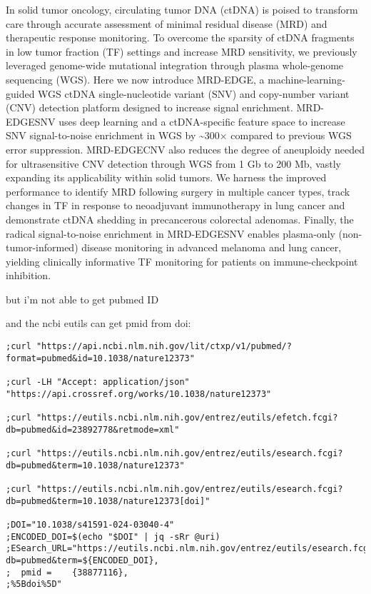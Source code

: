 \documentclass{article}
\begin{document}
\begin{itemize}
\begin{itemize}
\begin{itemize}
\begin{itemize}
In solid tumor oncology, circulating tumor DNA (ctDNA) is poised to transform care through accurate assessment of minimal residual disease (MRD) and therapeutic response monitoring. To overcome the sparsity of ctDNA fragments in low tumor fraction (TF) settings and increase MRD sensitivity, we previously leveraged genome-wide mutational integration through plasma whole-genome sequencing (WGS). Here we now introduce MRD-EDGE, a machine-learning-guided WGS ctDNA single-nucleotide variant (SNV) and copy-number variant (CNV) detection platform designed to increase signal enrichment. MRD-EDGESNV uses deep learning and a ctDNA-specific feature space to increase SNV signal-to-noise enrichment in WGS by \textasciitilde{}300× compared to previous WGS error suppression. MRD-EDGECNV also reduces the degree of aneuploidy needed for ultrasensitive CNV detection through WGS from 1 Gb to 200 Mb, vastly expanding its applicability within solid tumors. We harness the improved performance to identify MRD following surgery in multiple cancer types, track changes in TF in response to neoadjuvant immunotherapy in lung cancer and demonstrate ctDNA shedding in precancerous colorectal adenomas. Finally, the radical signal-to-noise enrichment in MRD-EDGESNV enables plasma-only (non-tumor-informed) disease monitoring in advanced melanoma and lung cancer, yielding clinically informative TF monitoring for patients on immune-checkpoint inhibition.

but i'm not able to get pubmed ID

and the ncbi eutils can get pmid from doi: 

\begin{verbatim}
;curl "https://api.ncbi.nlm.nih.gov/lit/ctxp/v1/pubmed/?format=pubmed&id=10.1038/nature12373"

;curl -LH "Accept: application/json" "https://api.crossref.org/works/10.1038/nature12373"

;curl "https://eutils.ncbi.nlm.nih.gov/entrez/eutils/efetch.fcgi?db=pubmed&id=23892778&retmode=xml"

;curl "https://eutils.ncbi.nlm.nih.gov/entrez/eutils/esearch.fcgi?db=pubmed&term=10.1038/nature12373"

;curl "https://eutils.ncbi.nlm.nih.gov/entrez/eutils/esearch.fcgi?db=pubmed&term=10.1038/nature12373[doi]"

;DOI="10.1038/s41591-024-03040-4"
;ENCODED_DOI=$(echo "$DOI" | jq -sRr @uri)
;ESearch_URL="https://eutils.ncbi.nlm.nih.gov/entrez/eutils/esearch.fcgi?db=pubmed&term=${ENCODED_DOI},
;  pmid =	 {38877116},
;%5Bdoi%5D"


\end{verbatim}
\end{itemize}
\end{itemize}
\end{itemize}
\end{itemize}
\end{document}
